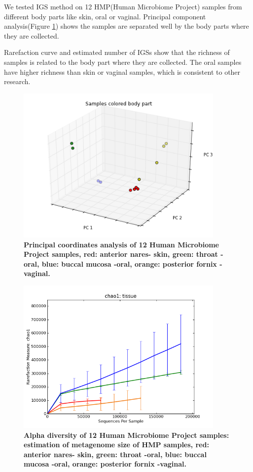 We tested IGS method on 12 HMP(Human Microbiome Project) samples from 
different body parts like skin, oral or vaginal. 
Principal component analysis(Figure \ref{fig:HMP_beta}) shows the samples are 
separated well by the body parts where they are collected.%

Rarefaction curve and estimated number of IGSs show that the richness of 
samples is related to the body part where they are collected. The 
oral samples have higher richness than skin or vaginal samples, 
which is consistent  to other research. \cite{Human-Microbiome-Project-Consortium:2012aa}



\begin{figure}[!ht]
 \centerline{\includegraphics[width=4in]{./figures/HMP_beta.png}}
\caption{\bf Principal coordinates analysis of 12 Human Microbiome Project
samples, red: anterior nares- skin, green: throat -oral, blue: buccal mucosa -oral, orange: 
posterior fornix -vaginal.}
\label{fig:HMP_beta}
\end{figure}

\begin{figure}[!ht]
 \centerline{\includegraphics[width=4in]{./figures/HMP_alpha.png}}
\caption{\bf Alpha diversity of 12 Human Microbiome Project samples:
 estimation of metagenome size of HMP samples,
red: anterior nares- skin, green: throat -oral, blue: buccal mucosa -oral, orange: 
posterior fornix -vaginal.}
\label{fig:HMP_alpha}
\end{figure}





